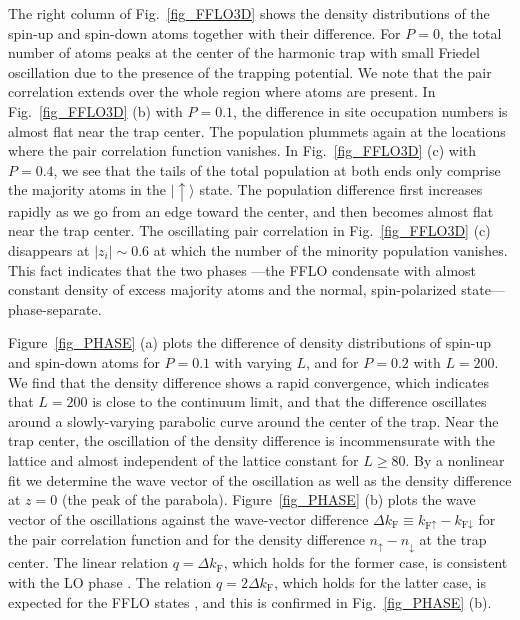 \documentclass[prl,twocolumn,superscriptaddress,showpacs,preprintnumbers,amsmath,amssymb]{revtex4}
\begin{document}
The right column of Fig.~\ref{fig_FFLO3D} shows the density distributions
of the spin-up and spin-down atoms together with their difference.
For $P=0$, the total number of atoms peaks at the center of the harmonic trap with
small Friedel oscillation due to the presence of the trapping potential.
We note that the pair correlation extends over the whole region
where atoms are present.
In Fig.~\ref{fig_FFLO3D} (b) with $P=0.1$,
the difference in site occupation numbers is almost
flat near the trap center.
The population plummets again at the locations where the pair correlation function vanishes.
In Fig.~\ref{fig_FFLO3D} (c) with $P=0.4$, 
we see that the tails of the total population at both ends
only comprise the majority atoms in the $|\uparrow\rangle$ state.
The population difference first increases rapidly as we go from an edge
toward the center, and then becomes almost flat near the trap center.
The oscillating pair correlation in Fig.~\ref{fig_FFLO3D} (c) disappears at
$|z_i|\sim 0.6$ at which the number of the minority population vanishes.
This fact indicates that the two phases
---the FFLO condensate with almost constant density of excess majority atoms and the normal,
spin-polarized state--- phase-separate.

Figure~\ref{fig_PHASE} (a) plots the difference of density distributions of
spin-up and spin-down atoms for $P=0.1$ with varying $L$,
and for $P=0.2$ with $L=200$. We find that the density difference shows a
rapid convergence, which indicates that $L=200$ is close to the continuum limit,
and that the difference oscillates around a slowly-varying parabolic
curve around the center of the trap.
Near the trap center, the oscillation of the density difference
is incommensurate with the lattice and
almost independent of the lattice constant for $L\geq 80$.
By a nonlinear fit we determine
the wave vector of the oscillation as well as the density difference at
$z=0$ (the peak of the parabola).
Figure~\ref{fig_PHASE} (b) plots the wave vector of the oscillations against
the wave-vector difference $\Delta k_\textrm{F}\equiv
k_{\textrm{F}\uparrow}-k_{\textrm{F}\downarrow}$
for the pair correlation function and for the density difference
$n_\uparrow - n_\downarrow$ at the trap center.
The linear relation $q=\Delta k_\textrm{F}$, which holds for the former case,
is consistent with the LO phase \cite{feiguin:220508,2007arXiv0710.1353B,2007arXiv0712.3364R}.
The relation
$q=2\Delta k_\mathrm{F}$, which holds for the latter case,
is expected for the FFLO states \cite{1984PhRvB..30..122M},
and this is confirmed in Fig.~\ref{fig_PHASE} (b).
\end{document}
